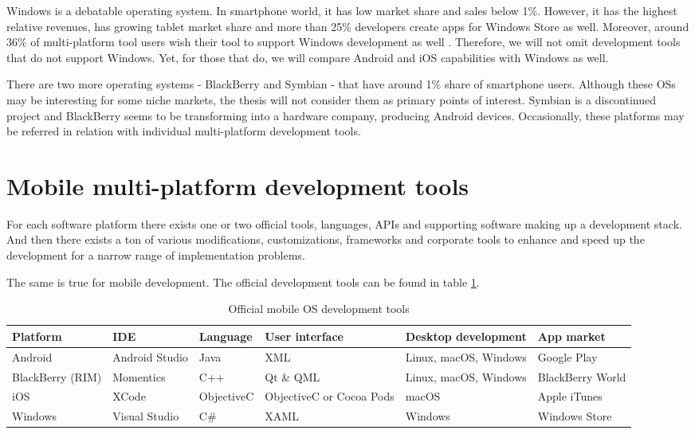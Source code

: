 \documentclass[english,master,public,dept460,male,cpdeclaration,oneside]{diploma}
\begin{document}
Windows is a debatable operating system. In smartphone world, it has low market share and sales below 1\%. However, it has the highest relative revenues, has growing tablet market share and more than 25\% developers create apps for Windows Store as well. Moreover, around 36\% of multi-platform tool users wish their tool to support Windows development as well \cite{cptBenchmarking2014}. Therefore, we will not omit development tools that do not support Windows. Yet, for those that do, we will compare Android and iOS capabilities with Windows as well.

There are two more operating systems - BlackBerry and Symbian - that have around 1\% share of smartphone users. Although these OSs may be interesting for some niche markets, the thesis will not consider them as primary points of interest. Symbian is a discontinued project and BlackBerry seems to be transforming into a hardware company, producing Android devices. Occasionally, these platforms may be referred in relation with individual multi-platform development tools.



\section{Mobile multi-platform development tools}
For each software platform there exists one or two official tools, languages, APIs and supporting software making up a development stack. And then there exists a ton of various modifications, customizations, frameworks and corporate tools to enhance and speed up the development for a narrow range of implementation problems.

The same is true for mobile development. The official development tools \cite{taxonomyCP} can be found in table \ref{table:officialDevelopmentTools}.
\begin{table}[!ht]
	\centering
	\caption{Official mobile OS development tools}
	\label{table:officialDevelopmentTools}
	\begin{tabular}{p{2cm} p{2cm} p{2cm} p{2.5cm} p{2.5cm} p{2.5cm}}
		\toprule
		Platform & IDE & Language & User interface & Desktop development & App market\\
		\midrule
		Android & Android Studio & Java & XML & Linux, macOS, Windows & Google Play\\
		BlackBerry (RIM) & Momentics & C++ & Qt \& QML & Linux, macOS, Windows & BlackBerry World \\
		iOS & XCode & ObjectiveC & ObjectiveC or Cocoa Pods & macOS & Apple iTunes \\
		Windows & Visual Studio & C\# & XAML & Windows & Windows Store \\
		\midrule
	\end{tabular}
\end{table}
\end{document}
